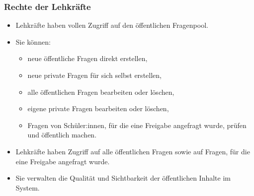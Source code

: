 \subsubsection{Rechte der Lehkräfte}
\begin{itemize}
    \item Lehkräfte haben vollen Zugriff auf den öffentlichen Fragenpool.
    \item Sie können:
    \begin{itemize}
        \item neue öffentliche Fragen direkt erstellen,
        \item neue private Fragen für sich selbst erstellen,
        \item alle öffentlichen Fragen bearbeiten oder löschen,
        \item eigene private Fragen bearbeiten oder löschen,
        \item Fragen von Schüler:innen, für die eine Freigabe angefragt wurde, prüfen und öffentlich machen.
    \end{itemize}
    \item Lehkräfte haben Zugriff auf alle öffentlichen Fragen sowie auf Fragen, für die eine Freigabe angefragt wurde.
    \item Sie verwalten die Qualität und Sichtbarkeit der öffentlichen Inhalte im System.
\end{itemize}

